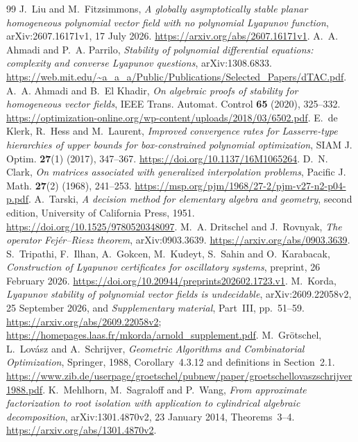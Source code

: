 \documentclass[11pt,a4paper]{article}
\theoremstyle{remark}\newtheorem{remark}[theorem]{Remark}
\begin{document}
\small
\begin{thebibliography}{99}
J.~Liu and M.~Fitzsimmons,
\emph{A globally asymptotically stable planar homogeneous polynomial
vector field with no polynomial Lyapunov function},
arXiv:2607.16171v1, 17 July 2026.
\url{https://arxiv.org/abs/2607.16171v1}.
A.~A. Ahmadi and P.~A. Parrilo,
\emph{Stability of polynomial differential equations:
complexity and converse Lyapunov questions}, arXiv:1308.6833.
\url{https://web.mit.edu/~a_a_a/Public/Publications/Selected_Papers/dTAC.pdf}.
A.~A. Ahmadi and B.~El Khadir,
\emph{On algebraic proofs of stability for homogeneous vector fields},
IEEE Trans. Automat. Control \textbf{65} (2020), 325--332.
\url{https://optimization-online.org/wp-content/uploads/2018/03/6502.pdf}.
E.~de Klerk, R.~Hess and M.~Laurent,
\emph{Improved convergence rates for Lasserre-type hierarchies of
upper bounds for box-constrained polynomial optimization},
SIAM J. Optim. \textbf{27}(1) (2017), 347--367.
\url{https://doi.org/10.1137/16M1065264}.
D.~N. Clark, \emph{On matrices associated with generalized
interpolation problems}, Pacific J. Math. \textbf{27}(2)
(1968), 241--253.
\url{https://msp.org/pjm/1968/27-2/pjm-v27-n2-p04-p.pdf}.
A.~Tarski, \emph{A decision method for elementary algebra and geometry},
second edition, University of California Press, 1951.
\url{https://doi.org/10.1525/9780520348097}.
M.~A. Dritschel and J.~Rovnyak,
\emph{The operator Fej\'er--Riesz theorem}, arXiv:0903.3639.
\url{https://arxiv.org/abs/0903.3639}.
S.~Tripathi, F.~Ilhan, A.~Gokcen, M.~Kudeyt, S.~Sahin and O.~Karabacak,
\emph{Construction of Lyapunov certificates for oscillatory systems},
preprint, 26 February 2026.
\url{https://doi.org/10.20944/preprints202602.1723.v1}.
M.~Korda, \emph{Lyapunov stability of polynomial vector fields is
undecidable}, arXiv:2609.22058v2, 25 September 2026, and
\emph{Supplementary material}, Part~III, pp.~51--59.
\url{https://arxiv.org/abs/2609.22058v2};
\url{https://homepages.laas.fr/mkorda/arnold_supplement.pdf}.
M.~Gr\"otschel, L.~Lov\'asz and A.~Schrijver,
\emph{Geometric Algorithms and Combinatorial Optimization},
Springer, 1988, Corollary~4.3.12 and definitions in Section~2.1.
\url{https://www.zib.de/userpage/groetschel/pubnew/paper/groetschellovaszschrijver1988.pdf}.
K.~Mehlhorn, M.~Sagraloff and P.~Wang,
\emph{From approximate factorization to root isolation with application
to cylindrical algebraic decomposition}, arXiv:1301.4870v2,
23 January 2014, Theorems~3--4.
\url{https://arxiv.org/abs/1301.4870v2}.
\end{thebibliography}
\end{document}
